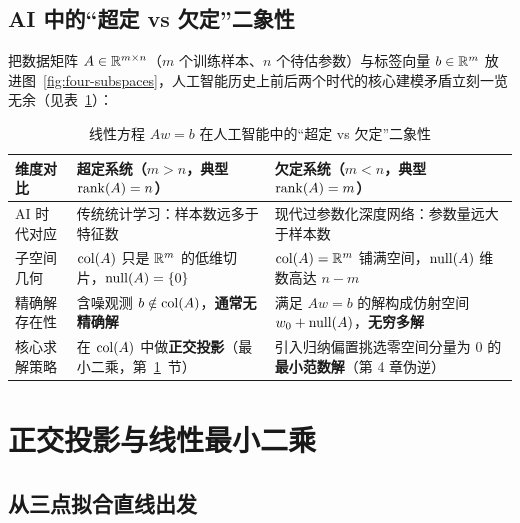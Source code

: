 \subsection{AI 中的“超定 vs 欠定”二象性}

把数据矩阵 $A \in \mathbb{R}^{m \times n}$（$m$ 个训练样本、$n$ 个待估参数）与标签向量 $b \in \mathbb{R}^m$ 放进图~\ref{fig:four-subspaces}，人工智能历史上前后两个时代的核心建模矛盾立刻一览无余（见表~\ref{tab:over-under}）：

\begin{table}[htbp]
\centering
\caption{线性方程 $Aw = b$ 在人工智能中的“超定 vs 欠定”二象性}\label{tab:over-under}
{\small
\begin{tabularx}{\linewidth}{@{}p{24mm}p{56mm}X@{}}
\toprule
\textbf{维度对比} & \textbf{超定系统（$m > n$，典型 $\operatorname{rank}(A) = n$）} & \textbf{欠定系统（$m < n$，典型 $\operatorname{rank}(A) = m$）} \\
\midrule
AI 时代对应 & 传统统计学习：样本数远多于特征数 & 现代过参数化深度网络：参数量远大于样本数 \\
子空间几何 & $\operatorname{col}(A)$ 只是 $\mathbb{R}^m$ 的低维切片，$\operatorname{null}(A)=\{0\}$ & $\operatorname{col}(A) = \mathbb{R}^m$ 铺满空间，$\operatorname{null}(A)$ 维数高达 $n-m$ \\
精确解存在性 & 含噪观测 $b \notin \operatorname{col}(A)$，\textbf{通常无精确解} & 满足 $Aw=b$ 的解构成仿射空间 $w_0 + \operatorname{null}(A)$，\textbf{无穷多解} \\
核心求解策略 & 在 $\operatorname{col}(A)$ 中做\textbf{正交投影}（最小二乘，第~\ref{sec:proj-ls}~节） & 引入归纳偏置挑选零空间分量为 $0$ 的\textbf{最小范数解}（第 4 章伪逆） \\
\bottomrule
\end{tabularx}}
\end{table}

\section{正交投影与线性最小二乘}\label{sec:proj-ls}

\subsection{从三点拟合直线出发}


